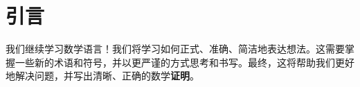 \section{引言}

我们继续学习数学语言！我们将学习如何正式、准确、简洁地表达想法。这需要掌握一些新的术语和符号，并以更严谨的方式思考和书写。最终，这将帮助我们更好地解决问题，并写出清晰、正确的数学\textbf{证明}。








